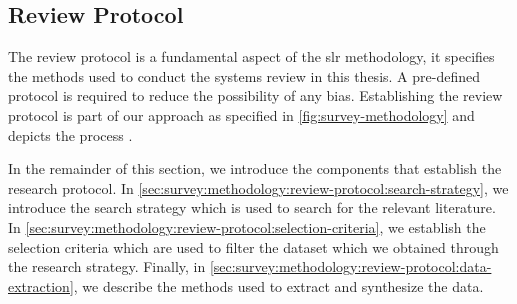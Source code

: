 




\subsection{Review Protocol}
\label{sec:survey:methodology:review-protocol}






The review protocol is a fundamental aspect of the \gls{slr} methodology, it specifies the methods used to conduct the systems review in this thesis. A pre-defined protocol is required to reduce the possibility of any bias. Establishing the review protocol is part of our approach as specified in \cref{fig:survey-methodology} and depicts the process .

In the remainder of this section, we introduce the components that establish the research protocol. In \cref{sec:survey:methodology:review-protocol:search-strategy}, we introduce the search strategy which is used to search for the relevant literature. In \cref{sec:survey:methodology:review-protocol:selection-criteria}, we establish the selection criteria which are used to filter the dataset which we obtained through the research strategy. Finally, in \cref{sec:survey:methodology:review-protocol:data-extraction}, we describe the methods used to extract and synthesize the data.



